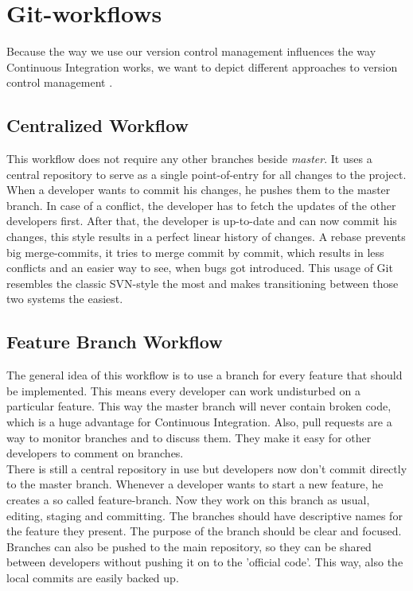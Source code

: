 \section{Git-workflows}

Because the way we use our version control management influences the way
Continuous Integration works, we want to depict different approaches to version
control management \cite{atlassian:2013}.

\subsection{Centralized Workflow}\label{sec:centralized-workflow}

This workflow does not require any other branches beside \textit{master}. It
uses a central repository to serve as a single point-of-entry for all changes to
the project. When a developer wants to commit his changes, he pushes them to
the master branch. In case of a conflict, the developer has to fetch the updates
of the other developers first. After that, the developer is up-to-date and can
now commit his changes, this style results in a perfect linear history of
changes. A rebase prevents big merge-commits, it tries to merge commit by
commit, which results in less conflicts and an easier way to see, when bugs got
introduced. This usage of Git resembles the classic SVN-style the most and
makes transitioning between those two systems the easiest. \\

\subsection{Feature Branch Workflow}

The general idea of this workflow is to use a branch for every feature that
should be implemented. This means every developer can work undisturbed on a
particular feature. This way the master branch will never contain broken code,
which is a huge advantage for Continuous Integration. Also, pull requests are a
way to monitor branches and to discuss them. They make it easy for other
developers to comment on branches.\\

There is still a central repository in use but developers now don't commit
directly to the master branch. Whenever a developer wants to start a new
feature, he creates a so called feature-branch. Now they work on this branch as
usual, editing, staging and committing. The branches should have descriptive
names for the feature they present. The purpose of the branch should be clear
and focused. Branches can also be pushed to the main repository, so they
can be shared between developers without pushing it on to the 'official code'.
This way, also the local commits are easily backed up.\\


